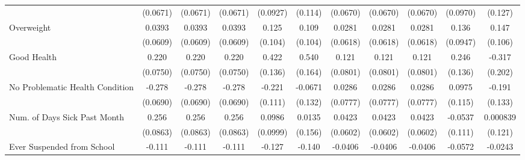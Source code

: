 {\begin{tabular}{l*{10}{c}}
            &    (0.0671)         &    (0.0671)         &    (0.0671)         &    (0.0927)         &     (0.114)         &    (0.0670)         &    (0.0670)         &    (0.0670)         &    (0.0970)         &     (0.127)         \\
\addlinespace
Overweight  &      0.0393         &      0.0393         &      0.0393         &       0.125         &       0.109         &      0.0281         &      0.0281         &      0.0281         &       0.136         &       0.147         \\
            &    (0.0609)         &    (0.0609)         &    (0.0609)         &     (0.104)         &     (0.104)         &    (0.0618)         &    (0.0618)         &    (0.0618)         &    (0.0947)         &     (0.106)         \\
\addlinespace
Good Health &       0.220\sym{**} &       0.220\sym{**} &       0.220\sym{**} &       0.422\sym{**} &       0.540\sym{**} &       0.121         &       0.121         &       0.121         &       0.246         &      -0.317         \\
            &    (0.0750)         &    (0.0750)         &    (0.0750)         &     (0.136)         &     (0.164)         &    (0.0801)         &    (0.0801)         &    (0.0801)         &     (0.136)         &     (0.202)         \\
\addlinespace
No Problematic Health Condition&      -0.278\sym{***}&      -0.278\sym{***}&      -0.278\sym{***}&      -0.221\sym{*}  &     -0.0671         &      0.0286         &      0.0286         &      0.0286         &      0.0975         &      -0.191         \\
            &    (0.0690)         &    (0.0690)         &    (0.0690)         &     (0.111)         &     (0.132)         &    (0.0777)         &    (0.0777)         &    (0.0777)         &     (0.115)         &     (0.133)         \\
\addlinespace
Num. of Days Sick Past Month&       0.256\sym{**} &       0.256\sym{**} &       0.256\sym{**} &      0.0986         &      0.0135         &      0.0423         &      0.0423         &      0.0423         &     -0.0537         &    0.000839         \\
            &    (0.0863)         &    (0.0863)         &    (0.0863)         &    (0.0999)         &     (0.156)         &    (0.0602)         &    (0.0602)         &    (0.0602)         &     (0.111)         &     (0.121)         \\
\addlinespace
Ever Suspended from School&      -0.111\sym{*}  &      -0.111\sym{*}  &      -0.111\sym{*}  &      -0.127         &      -0.140         &     -0.0406         &     -0.0406         &     -0.0406         &     -0.0572         &     -0.0243         \\

\end{tabular}}
